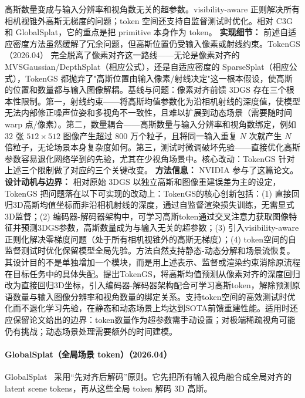 高斯数量变成与输入分辨率和视角数无关的超参数。visibility-aware 正则解决所有相机视锥外高斯无梯度的问题；token 空间还支持自监督测试时优化。相对 C3G 和 GlobalSplat，它的重点是把 primitive 本身作为 token。
\textbf{实现细节：} 前述自适应密度方法虽然缓解了冗余问题，但高斯位置仍受输入像素或射线约束。TokenGS（2026.04） 完全脱离了像素对齐这一路线——无论是像素对齐的 MVSGaussian/DepthSplat（相应公式），还是自适应密度的 SparseSplat（相应公式），TokenGS 都抛弃了"高斯位置由输入像素/射线决定"这一根本假设，使高斯的位置和数量都与输入图像解耦。基线与问题：像素对齐前馈 3DGS 存在三个根本性限制。第一，射线约束——将高斯均值参数化为沿相机射线的深度值，使模型无法内部修正噪声位姿和多视角不一致性，且难以扩展到动态场景（需要随时间 warp 点/像素）。第二，数量耦合——高斯数量与输入分辨率和视角数绑定，例如 32 张 $512 \times 512$ 图像产生超过 800 万个粒子，且将同一输入重复 $N$ 次就产生 $N$ 倍粒子，无论场景本身复杂度如何。第三，测试时微调破坏先验——直接优化高斯参数容易退化网络学到的先验，尤其在少视角场景中。核心改动：TokenGS 针对上述三个限制做了对应的三个关键改变。
\textbf{方法信息：} NVIDIA 参与了这篇论文。
\textbf{设计动机与边界：} 相对原始 3DGS 以独立高斯和图像重建误差为主的设定，TokenGS 把问题落在以下可实现的改动上：TokenGS的核心创新包括：(1) 直接回归3D高斯均值坐标而非沿相机射线的深度，通过自监督渲染损失训练，无需显式3D监督；(2) 编码器-解码器架构中，可学习高斯token通过交叉注意力获取图像特征并预测3DGS参数，高斯数量成为与输入无关的超参数；(3) 引入visibility-aware正则化解决零梯度问题（处于所有相机视锥外的高斯无梯度）；(4) token空间的自监督测试时优化保留模型全局先验。方法自然支持静态-动态分解和场景流恢复。其设计目的不是单独增加一个模块，而是用上述表示、监督或渲染约束消除原流程在目标任务中的具体失配。提出TokenGS，将高斯均值预测从像素对齐的深度回归改为直接回归3D坐标，引入编码器-解码器架构配合可学习高斯token，解除预测原语数量与输入图像分辨率和视角数量的绑定关系。支持token空间的高效测试时优化而不退化学习先验，在静态和动态场景上均达到SOTA前馈重建性能。适用时还应保留论文给出的边界：token数量作为超参数需手动设置；对极端稀疏视角可能仍有挑战；动态场景处理需要额外的时间建模。
\paragraph{GlobalSplat（全局场景 token）（2026.04）}
GlobalSplat~\cite{2604_15284} 采用“先对齐后解码”原则。它先把所有输入视角融合成全局对齐的 latent scene tokens，再从这些全局 token 解码 3D 高斯。

